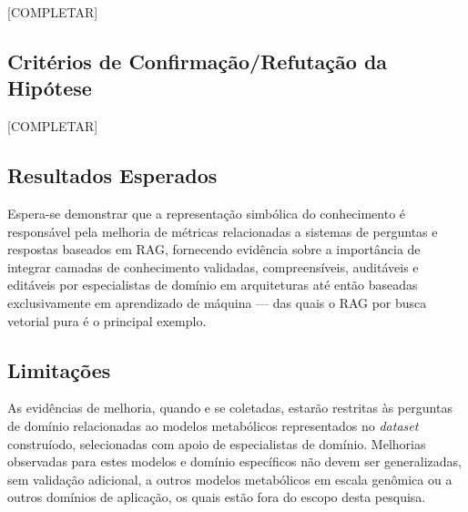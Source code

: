 \documentclass{article}
\begin{document}
[COMPLETAR]

\subsection{Critérios de Confirmação/Refutação da Hipótese}

[COMPLETAR]

\subsection{Resultados Esperados}

Espera-se demonstrar que a representação simbólica do conhecimento é responsável pela melhoria de métricas relacionadas a sistemas de perguntas e respostas baseados em RAG, fornecendo evidência sobre a importância de integrar camadas de conhecimento validadas, compreensíveis, auditáveis e editáveis por especialistas de domínio em arquiteturas até então baseadas exclusivamente em aprendizado de máquina --- das quais o RAG por busca vetorial pura é o principal exemplo.

\subsection{Limitações}

As evidências de melhoria, quando e se coletadas, estarão restritas às perguntas de domínio relacionadas ao modelos metabólicos representados no \textit{dataset} construíodo, selecionadas com apoio de especialistas de domínio. Melhorias observadas para estes modelos e domínio específicos não devem ser generalizadas, sem validação adicional, a outros modelos metabólicos em escala genômica ou a outros domínios de aplicação, os quais estão fora do escopo desta pesquisa.


\printbibliography
\end{document}
